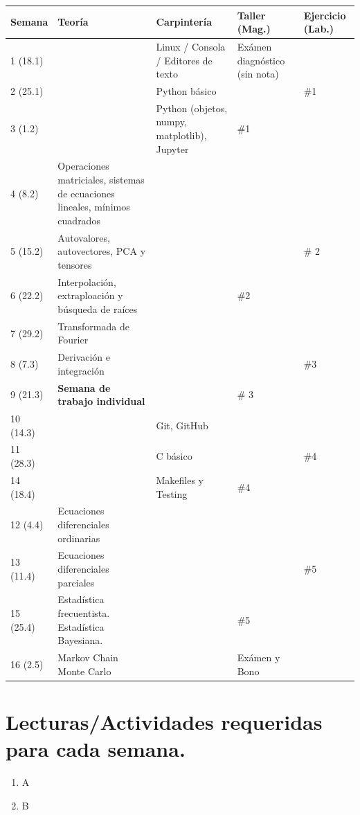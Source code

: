 \documentclass[11pt]{article}
\begin{document}
\begin{center}
\renewcommand{\arraystretch}{1.1}
\begin{tabular}{|p{1.6cm}|p{4.5cm}|p{4.50cm}|p{2.0cm}|p{2.0cm}|}
\hline
Semana & Teor\'ia & Carpinter\'ia & Taller (Mag.) & Ejercicio (Lab.) \\\hline
1 (18.1) &     & Linux / Consola / Editores de texto &  Ex\'amen
diagn\'ostico (sin nota) & \\\hline
2 (25.1) & 	& Python b\'asico & & \#1 \\\hline
3 (1.2) & 	& Python (objetos, numpy, matplotlib), Jupyter& \#1 & \\\hline 
4 (8.2) & 	Operaciones matriciales, sistemas de ecuaciones lineales,
m\'inimos cuadrados & &  & \\\hline
5 (15.2) &  Autovalores, autovectores, PCA y tensores& & & \# 2 \\\hline
6 (22.2) &  Interpolaci\'on, extraploaci\'on y b\'usqueda de ra\'ices
& & \#2 & \\\hline
7 (29.2) &  Transformada de Fourier & & & \\ \hline
8 (7.3) & Derivaci\'on e integraci\'on &  &  & \#3 \\\hline
9 (21.3) & {\bf Semana de trabajo individual} & & \# 3&\\\hline
10 (14.3) & & Git, GitHub &  & \\\hline
11 (28.3) & & C b\'asico & & \#4 \\\hline
14 (18.4) & & Makefiles y Testing & \#4& \\\hline
12 (4.4) & Ecuaciones diferenciales ordinarias & & & \\\hline 
13 (11.4) & Ecuaciones diferenciales parciales & & & \#5 \\\hline
15 (25.4) & Estad\'istica frecuentista. Estad\'istica Bayesiana. &   &
\#5  & \\\hline 
16 (2.5) & Markov Chain Monte Carlo&   & Ex\'amen y
Bono &\\\hline 
\end{tabular}
\end{center}

\section*{Lecturas/Actividades requeridas para cada semana.}

\begin{enumerate}
\item A
\item B

\end{enumerate}
\end{document}
